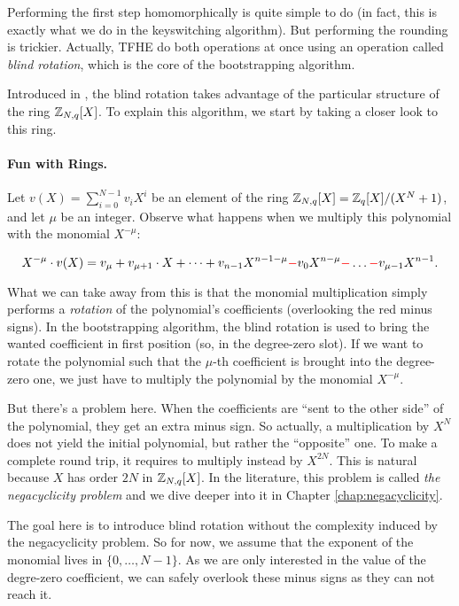 Performing the first step homomorphically is quite simple to do (in fact, this is exactly what we do in the keyswitching algorithm). But performing the rounding is trickier. Actually, \gls{TFHE} do both operations at once using an operation called \textit{blind rotation}, which is the core of the bootstrapping algorithm. 

Introduced in \cite{EC:DucMic15}, the blind rotation takes advantage of the particular structure of the ring $\mathbb{Z}_{N,q}[X]$. To explain this algorithm, we start by taking a closer look to this ring.




\paragraph{Fun with Rings.}

Let $v(X) = \displaystyle \sum_{i=0}^{N-1} v_i X^i$ be an element of the ring $\mathbb{Z}_{N,q}[X] = \mathbb{Z}_q[X] / (X^N + 1)$, and let $\mu$ be an integer. Observe what happens when we multiply this polynomial with the monomial $X^{-\mu}$:

\begin{equation*}
	X^{-\mu} \cdot v(X) = v_\mu + v_{\mu + 1} \cdot X + \dots + v_{n-1} X^{n-1-\mu} \textcolor{red}{-} v_0 X^{n - \mu} \textcolor{red}{-} \dots \textcolor{red}{-} v_{\mu - 1} X^{n-1}.
\end{equation*}

What we can take away from this is that the monomial multiplication simply performs a \textit{rotation} of the polynomial's coefficients (overlooking the red minus signs). In the bootstrapping algorithm, the blind rotation is used to bring the wanted coefficient in first position (so, in the degree-zero slot). If we want to rotate the polynomial such that the $\mu$-th coefficient is brought into the degree-zero one, we just have to multiply the polynomial by the monomial $X^{-\mu}$.

But there's a problem here. When the coefficients are ``sent to the other side'' of the polynomial, they get an extra minus sign. So actually, a multiplication by $X^N$ does not yield the initial polynomial, but rather the ``opposite'' one. To make a complete round trip, it requires to multiply instead by $X^{2N}$. This is natural because $X$ has order $2N$ in $\mathbb{Z}_{N,q}[X]$. In the literature, this problem is called \textit{the negacyclicity problem} and we dive deeper into it in Chapter \ref{chap:negacyclicity}.

The goal here is to introduce blind rotation without the complexity induced by the negacyclicity problem. So for now, we assume that the exponent of the monomial lives in $\lbrace 0, \dots, N-1 \rbrace$. As we are only interested in the value of the degre-zero coefficient, we can safely overlook these minus signs as they can not reach it.


